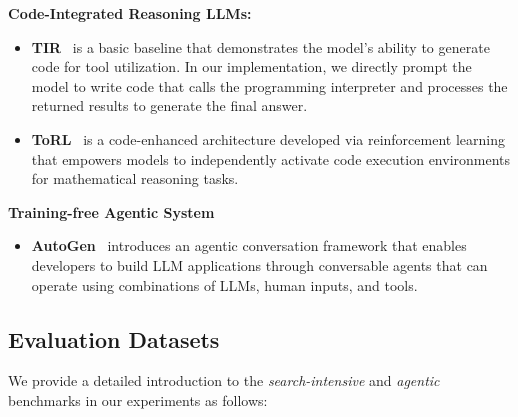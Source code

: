 \textbf{Code-Integrated Reasoning LLMs:}
\begin{itemize}[leftmargin=1em]
\item \textbf{TIR}~\citep{yang2024qwen2} is a basic baseline that demonstrates the model's ability to generate code for tool utilization. In our implementation, we directly prompt the model to write code that calls the programming interpreter and processes the returned results to generate the final answer.

\item \textbf{ToRL}~\citep{li2025torl} is a code-enhanced architecture developed via reinforcement learning that empowers models to independently activate code execution environments for mathematical reasoning tasks.
\end{itemize}

\textbf{Training-free Agentic System}

\begin{itemize}[leftmargin=1em]
\item \textbf{AutoGen}~\citep{wu2024autogen} introduces an agentic conversation framework that enables developers to build LLM applications through conversable agents that can operate using combinations of LLMs, human inputs, and tools.
\end{itemize}



\subsection{Evaluation Datasets}
\label{app:datasets}
We provide a detailed introduction to the \textit{search-intensive} and \textit{agentic} benchmarks in our experiments as follows:

